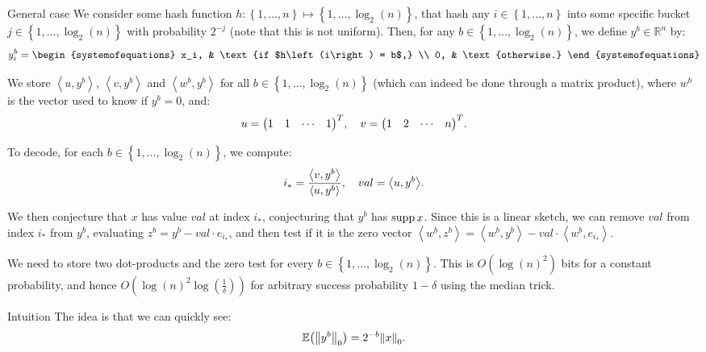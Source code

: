 \documentclass[a4paper]{article}
\begin{document}
\begin{parag}{General case}
    We consider some hash function $h: \left\{1, \ldots, n\right\} \mapsto \left\{1, \ldots, \log_{2}\left(n\right)\right\}$, that hash any $i \in \left\{1, \ldots, n\right\}$ into some specific bucket $j \in \left\{1, \ldots, \log_{2}\left(n\right)\right\}$ with probability $2^{-j}$ (note that this is not uniform). Then, for any $b \in \left\{1, \ldots, \log_{2}\left(n\right)\right\}$, we define $y^b \in \mathbb{R}^n$ by:
    \[y^b_i = \begin{systemofequations} x_i, & \text{if $h\left(i\right) = b$,} \\ 0, & \text{otherwise.} \end{systemofequations}\]

    We store $\left\langle u, y^b \right\rangle$, $\left\langle v, y^b \right\rangle$ and $\left\langle w^b, y^b \right\rangle$ for all $b \in \left\{1, \ldots, \log_{2}\left(n\right)\right\}$ (which can indeed be done through a matrix product), where $w^b$ is the vector used to know if $y^b = 0$, and:
    \[u = \begin{pmatrix} 1 & 1 & \cdots & 1 \end{pmatrix}^T, \mathspace v =\begin{pmatrix} 1 & 2 & \cdots & n \end{pmatrix}^T.\] 

    To decode, for each $b \in \left\{1, \ldots, \log_{2}\left(n\right)\right\}$, we compute: 
    \[i_* = \frac{\left\langle v, y^b \right\rangle}{\left\langle u, y^b \right\rangle}, \mathspace val = \left\langle u, y^b \right\rangle.\]
    
    We then conjecture that $x$ has value $val$ at index $i_*$, conjecturing that $y^b$ has $\operatorname{supp} x$. Since this is a linear sketch, we can remove $val$ from index $i_*$ from $y^b$, evaluating $z^b = y^b - val\cdot e_{i_*}$, and then test if it is the zero vector $\left\langle w^b, z^b \right\rangle = \left\langle w^b, y^b \right\rangle - val\cdot \left\langle w^b, e_{i_*} \right\rangle$. 
    
    We need to store two dot-products and the zero test for every $b \in \left\{1, \ldots, \log_{2}\left(n\right)\right\}$. This is $O\left(\log\left(n\right)^2\right)$ bits for a constant probability, and hence $O\left(\log\left(n\right)^2 \log\left(\frac{1}{\delta}\right)\right)$ for arbitrary success probability $1 - \delta$ using the median trick.

    \begin{subparag}{Intuition}
        The idea is that we can quickly see: 
        \[\exval\left(\left\|y^b\right\|_0\right) = 2^{-b} \left\|x\right\|_0.\]
        

\end{subparag}
\end{parag}
\end{document}
